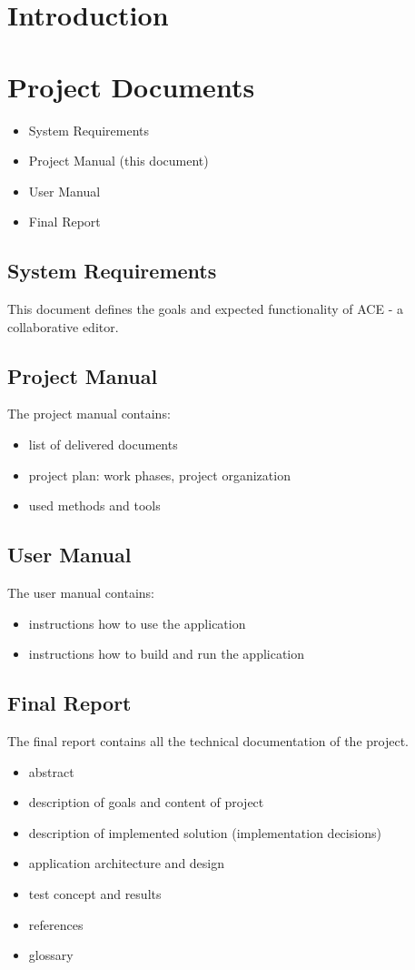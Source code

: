 \documentclass[11pt,a4paper]{article}
\begin{document}


\section{Introduction}

\section{Project Documents}

\begin{itemize}
 \item System Requirements
 \item Project Manual (this document)
 \item User Manual
 \item Final Report
\end{itemize}

\subsection{System Requirements}
This document defines the goals and expected functionality of ACE - a collaborative editor.

\subsection{Project Manual}
The project manual contains:
\begin{itemize}
 \item list of delivered documents
 \item project plan: work phases, project organization
 \item used methods and tools
\end{itemize}

\subsection{User Manual}
The user manual contains:
\begin{itemize}
 \item instructions how to use the application
 \item instructions how to build and run the application
\end{itemize}

\subsection{Final Report}
The final report contains all the technical documentation of the project.
\begin{itemize}
 \item abstract
 \item description of goals and content of project
 \item description of implemented solution (implementation decisions)
 \item application architecture and design
 \item test concept and results
 \item references
 \item glossary
\end{itemize}
\end{document}
